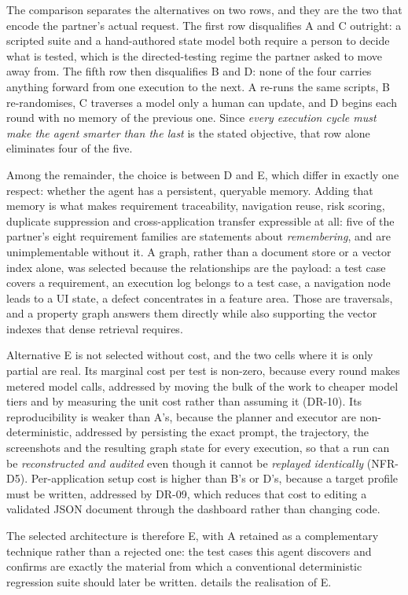 The comparison separates the alternatives on two rows, and they are the two
that encode the partner's actual request. The first row disqualifies A and C
outright: a scripted suite and a hand-authored state model both require a
person to decide what is tested, which is the directed-testing regime the
partner asked to move away from. The fifth row then disqualifies B and D: none
of the four carries anything forward from one execution to the next. A re-runs
the same scripts, B re-randomises, C traverses a model only a human can update,
and D begins each round with no memory of the previous one. Since \emph{every
execution cycle must make the agent smarter than the last} is the stated
objective, that row alone eliminates four of the five.

Among the remainder, the choice is between D and E, which differ in exactly one
respect: whether the agent has a persistent, queryable memory. Adding that
memory is what makes requirement traceability, navigation reuse, risk scoring,
duplicate suppression and cross-application transfer expressible at all: five
of the partner's eight requirement families are statements about
\emph{remembering}, and are unimplementable without it. A graph, rather than a
document store or a vector index alone, was selected because the relationships
are the payload: a test case covers a requirement, an execution log belongs to
a test case, a navigation node leads to a UI state, a defect concentrates in a
feature area. Those are traversals, and a property graph answers them directly
while also supporting the vector indexes that dense retrieval requires.

Alternative E is not selected without cost, and the two cells where it is only
partial are real. Its marginal cost per test is non-zero, because every round
makes metered model calls, addressed by moving the bulk of the work to cheaper
model tiers and by measuring the unit cost rather than assuming it (DR-10). Its
reproducibility is weaker than A's, because the planner and executor are
non-deterministic, addressed by persisting the exact prompt, the trajectory,
the screenshots and the resulting graph state for every execution, so that a
run can be \emph{reconstructed and audited} even though it cannot be
\emph{replayed identically} (NFR-D5). Per-application setup cost is higher than
B's or D's, because a target profile must be written, addressed by DR-09, which
reduces that cost to editing a validated JSON document through the dashboard
rather than changing code.

The selected architecture is therefore E, with A retained as a complementary
technique rather than a rejected one: the test cases this agent discovers and
confirms are exactly the material from which a conventional deterministic
regression suite should later be written.  details the
realisation of E.
